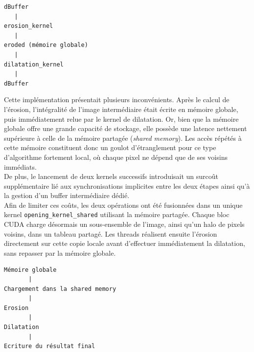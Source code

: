 \documentclass[12pt]{article}
\begin{document}
    \begin{verbatim}
dBuffer
   |
erosion_kernel
   |
eroded (mémoire globale)
   |
dilatation_kernel
   |
dBuffer
    \end{verbatim}

    Cette implémentation présentait plusieurs inconvénients. Après le calcul de l'érosion, l'intégralité de l'image intermédiaire était écrite en mémoire globale, puis immédiatement relue par le kernel de dilatation. Or, bien que la mémoire globale offre une grande capacité de stockage, elle possède une latence nettement supérieure à celle de la mémoire partagée (\textit{shared memory}). Les accès répétés à cette mémoire constituent donc un goulot d'étranglement pour ce type d'algorithme fortement local, où chaque pixel ne dépend que de ses voisins immédiats.
    \\
    De plus, le lancement de deux kernels successifs introduisait un surcoût supplémentaire lié aux synchronisations implicites entre les deux étapes ainsi qu'à la gestion d'un buffer intermédiaire dédié.
    \\
    Afin de limiter ces coûts, les deux opérations ont été fusionnées dans un unique kernel \verb|opening_kernel_shared| utilisant la mémoire partagée. Chaque bloc CUDA charge désormais un sous-ensemble de l'image, ainsi qu'un halo de pixels voisins, dans un tableau partagé. Les threads réalisent ensuite l'érosion directement sur cette copie locale avant d'effectuer immédiatement la dilatation, sans repasser par la mémoire globale.

    \begin{verbatim}
Mémoire globale
       |
Chargement dans la shared memory
       |
Erosion
       |
Dilatation
       |
Ecriture du résultat final
    \end{verbatim}
\end{document}
